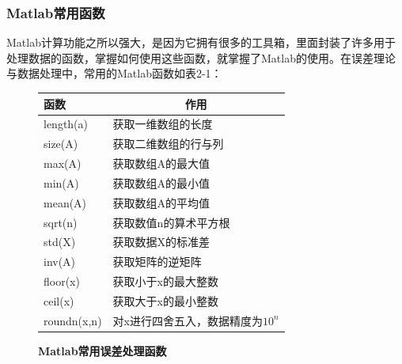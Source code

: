 \subsubsection{Matlab常用函数}
Matlab计算功能之所以强大，是因为它拥有很多的工具箱，里面封装了许多用于处理数据的函数，掌握如何使用这些函数，就掌握了Matlab的使用。在误差理论与数据处理中，常用的Matlab函数如表2-1：
\begin{figure}[H]
	\centering
	\captionsetup{type=table}
	\caption{\textbf{Matlab常用误差处理函数}}
	\begin{tabular}{p{3cm}<{\centering}p{8cm}}
		\toprule
		\textbf{函数}&\multicolumn{1}{c}{\textbf{作用}}	\\
		\midrule
		length(a)	&获取一维数组的长度\\
		size(A)	&获取二维数组的行与列\\
		max(A)	&获取数组A的最大值\\
		min(A)	&获取数组A的最小值\\
		mean(A)	&获取数组A的平均值\\
		sqrt(n)	&获取数值n的算术平方根\\
		std(X)	&获取数据X的标准差\\
		inv(A)	&获取矩阵的逆矩阵\\
		floor(x)	&获取小于x的最大整数\\
		ceil(x)	&获取大于x的最小整数\\
		roundn(x,n)	&对x进行四舍五入，数据精度为$ 10^n $\\
		\bottomrule
	\end{tabular}
\end{figure}
